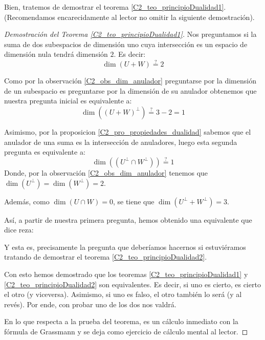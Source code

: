 Bien, tratemos de demostrar el teorema \ref{C2_teo_principioDualidad1}. (Recomendamos encarecidamente al lector no omitir la siguiente demostración).
\begin{proof}[Demostración del Teorema \ref{C2_teo_principioDualidad1}]
	Nos preguntamos si la suma de dos subespacios de dimensión uno cuya intersección es un espacio de dimensión nula tendrá dimensión $2$. Es decir:
	\begin{equation*}
		\dim(U+W)\stackrel{\mathrm{?}}{=}2
	\end{equation*}
	
	Como por la observación \ref{C2_obs_dim_anulador} preguntarse por la dimensión de un subespacio es preguntarse por la dimensión de su anulador obtenemos que nuestra pregunta inicial es equivalente a:
	\begin{equation*}
		\dim((U+W)^\perp)\stackrel{\mathrm{?}}{=}3-2=1
	\end{equation*}
	
	Asimismo, por la proposicion \ref{C2_pro_propiedades_dualidad} sabemos que el anulador de una suma es la intersección de anuladores, luego esta segunda pregunta es equivalente a:
	\begin{equation*}
		\dim((U^\perp\cap W^\perp))\stackrel{\mathrm{?}}{=}1
	\end{equation*}
	Donde, por la observación \ref{C2_obs_dim_anulador} tenemos que $\dim(U^\perp)=\dim(W^\perp)=2$.
	
	Además, como $\dim(U\cap W)=0$, se tiene que $\dim(U^\perp+W^\perp)=3$.
	
	Así, a partir de nuestra primera pregunta, hemos obtenido una equivalente que dice reza:
	
	
	Y esta es, precisamente la pregunta que deberíamos hacernos si estuviéramos tratando de demostrar el teorema \ref{C2_teo_principioDualidad2}.
	
	Con esto hemos demostrado que los teoremas \ref{C2_teo_principioDualidad1} y \ref{C2_teo_principioDualidad2} son equivalentes. Es decir, si uno es cierto, es cierto el otro (y viceversa). Asimismo, si uno es falso, el otro también lo será (y al revés). Por ende, con probar uno de los dos nos valdrá.
	
	En lo que respecta a la prueba del teorema, es un cálculo inmediato con la fórmula de Grassmann y se deja como ejercicio de cálculo mental al lector.
\end{proof}

